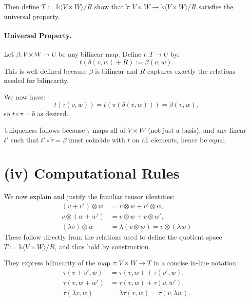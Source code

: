 \documentclass[10pt]{tufte-handout}
\begin{document}
\noindent
Then define $T := \mathds{k}\langle V \times W \rangle / R$ show that $\widetilde{\tau}: V \times W \to \mathds{k} \langle V \times W \rangle / R$ satisfies the universal property.




\paragraph{Universal Property.} Let $\beta : V \times W \to U$ be any bilinear map. Define $t : T \to U$ by:
\[ t(\delta(v,w) + R) := \beta(v,w). \]
This is well-defined because $\beta$ is bilinear and $R$ captures exactly the relations needed for bilinearity. 

We now have:
\[
   t(\tau(v,w)) = t(\pi(\delta(v,w))) = \beta(v,w),
\]
so $t \circ \widetilde{\tau} = b$ as desired.

Uniqueness follows because $\widetilde{\tau}$ maps all of $V \times W$ (not just a basis), and any linear $t'$ such that $t' \circ \widetilde{\tau} = \beta$ must coincide with $t$ on all elements, hence be equal.

\section{(iv) Computational Rules}
We now explain and justify the familiar tensor identities:
\begin{align*}
(v + v') \otimes w &= v \otimes w + v' \otimes w, \\
v \otimes (w + w') &= v \otimes w + v \otimes w', \\
(\lambda v) \otimes w &= \lambda(v \otimes w) = v \otimes (\lambda w)
\end{align*}
These follow directly from the relations used to define the quotient space $T := \mathds{k}\langle V \times W \rangle / R$, and thus hold by construction.

They express bilinearity of the map $\tau : V \times W \to T$ in a concise in-line notation:
\begin{align*}
\tau(v + v', w) &= \tau(v, w) + \tau(v', w), \\
\tau(v, w + w') &= \tau(v, w) + \tau(v, w'), \\
\tau(\lambda v, w) &= \lambda \tau(v, w) = \tau(v, \lambda w).
\end{align*}
\end{document}
